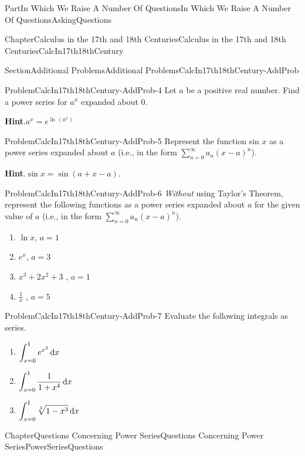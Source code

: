\documentclass[oneside,10pt,]{book}
\newcommand{\blocktitlefont}{\relax}
\numberwithin{equation}{part}
\newcommand{\dx}[1]{\,{\rm d}#1}
\begin{document}
\begin{partptx}{Part}{In Which We Raise A Number Of Questions}{}{In Which We Raise A Number Of Questions}{}{}{AskingQuestions}
\begin{chapterptx}{Chapter}{Calculus in the 17th and 18th Centuries}{}{Calculus in the 17th and 18th Centuries}{}{}{CalcIn17th18thCentury}
\begin{sectionptx}{Section}{Additional Problems}{}{Additional Problems}{}{}{CalcIn17th18thCentury-AddProb}
\begin{problem}{Problem}{}{CalcIn17th18thCentury-AddProb-4}
Let \(a\) be a positive real number.  Find a power series for \(a^x\) expanded about 0.%
\par\smallskip%
\noindent\textbf{\blocktitlefont Hint}.\hypertarget{CalcIn17th18thCentury-AddProb-4-3}{}\quad{}\(a^x=e^{\ln\,\left(a^x\right)}\)%
\end{problem}
\begin{problem}{Problem}{}{CalcIn17th18thCentury-AddProb-5}%
Represent the function \(\)sin \(x\) as a power series expanded about \(a\) (i.e., in the form \(\sum_{n=0}^\infty a_n\left(x-a\right)^n\)).%
\par\smallskip%
\noindent\textbf{\blocktitlefont Hint}.\hypertarget{CalcIn17th18thCentury-AddProb-5-4}{}\quad{}\(\sin x=\sin \left(a+x-a\right)\).%
\end{problem}
\begin{problem}{Problem}{}{CalcIn17th18thCentury-AddProb-6}%
\emph{Without} using Taylor's Theorem, represent the following functions as a power series expanded about \(a\) for the given value of \(a\) (i.e., in the form \(\sum_{n=0}^\infty a_n\left(x-a\right)^n\)).%
\begin{enumerate}[font=\bfseries,label=(\alph*),ref=\alph*]%
\item{}\(\ln x\), \(a=1\)%
\item{}\(e^x\), \(a=3\)%
\item{}\(x^3+2x^2+3\) , \(a=1\)%
\item{}\(\frac{1}{x}\) , \(a=5\)%
\end{enumerate}%
\end{problem}
\begin{problem}{Problem}{}{CalcIn17th18thCentury-AddProb-7}%
Evaluate the following integrals as series.%
\begin{enumerate}[font=\bfseries,label=(\alph*),ref=\alph*]%
\item{}\(\displaystyle\int_{x=0}^1e^{x^2}\dx{ x}\)%
\item{}\(\displaystyle\int_{x=0}^1\frac{1}{1+x^4}\dx{ x}\)%
\item{}\(\displaystyle\int_{x=0}^1\sqrt[3]{1-x^3}\dx{ x}\)%
\end{enumerate}%
\end{problem}
\end{sectionptx}
\end{chapterptx}
%
%
\typeout{************************************************}
\typeout{************************************************}
%
\begin{chapterptx}{Chapter}{Questions Concerning Power Series}{}{Questions Concerning Power Series}{}{}{PowerSeriesQuestions}

\end{chapterptx}
\end{partptx}
\end{document}
